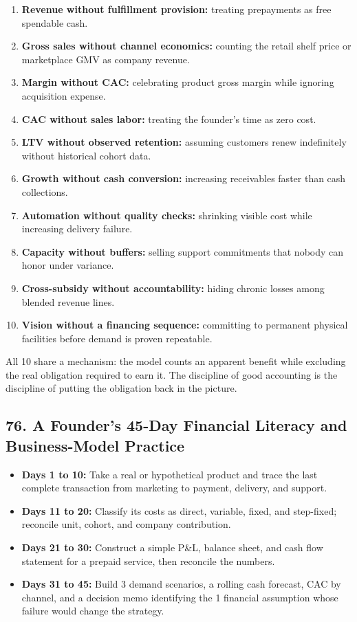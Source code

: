 \begin{enumerate}
  \item \textbf{Revenue without fulfillment provision:} treating prepayments as free spendable cash.
  \item \textbf{Gross sales without channel economics:} counting the retail shelf price or marketplace GMV as company revenue.
  \item \textbf{Margin without CAC:} celebrating product gross margin while ignoring acquisition expense.
  \item \textbf{CAC without sales labor:} treating the founder's time as zero cost.
  \item \textbf{LTV without observed retention:} assuming customers renew indefinitely without historical cohort data.
  \item \textbf{Growth without cash conversion:} increasing receivables faster than cash collections.
  \item \textbf{Automation without quality checks:} shrinking visible cost while increasing delivery failure.
  \item \textbf{Capacity without buffers:} selling support commitments that nobody can honor under variance.
  \item \textbf{Cross-subsidy without accountability:} hiding chronic losses among blended revenue lines.
  \item \textbf{Vision without a financing sequence:} committing to permanent physical facilities before demand is proven repeatable.
\end{enumerate}

All 10 share a mechanism: the model counts an apparent benefit while excluding the real obligation required to earn it. The discipline of good accounting is the discipline of putting the obligation back in the picture.

\subsection*{76. A Founder's 45-Day Financial Literacy and Business-Model Practice}

\begin{itemize}
  \item \textbf{Days 1 to 10:} Take a real or hypothetical product and trace the last complete transaction from marketing to payment, delivery, and support.
  \item \textbf{Days 11 to 20:} Classify its costs as direct, variable, fixed, and step-fixed; reconcile unit, cohort, and company contribution.
  \item \textbf{Days 21 to 30:} Construct a simple P\&L, balance sheet, and cash flow statement for a prepaid service, then reconcile the numbers.
  \item \textbf{Days 31 to 45:} Build 3 demand scenarios, a rolling cash forecast, CAC by channel, and a decision memo identifying the 1 financial assumption whose failure would change the strategy.
\end{itemize}

